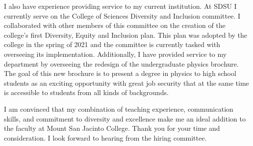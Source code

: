 I also have experience providing service to my current institution. At SDSU I currently serve on the College of Sciences Diversity and Inclusion committee. I collaborated with other members of this committee on the creation of the college's first Diversity, Equity and Inclusion plan. This plan was adopted by the college in the spring of 2021 and the committee is currently tasked with overseeing its implementation. Additionally, I have provided service to my department by overseeing the redesign of the undergraduate physics brochure. The goal of this new brochure is to present a degree in physics to high school students as an exciting opportunity with great job security that at the same time is accessible to students from all kinds of backgrounds.

I am convinced that my combination of teaching experience, communication skills, and commitment to diversity and excellence make me an ideal addition to the faculty at Mount San Jacinto College. Thank you for your time and consideration. I look forward to hearing from the hiring committee.


\makeletterclosing


